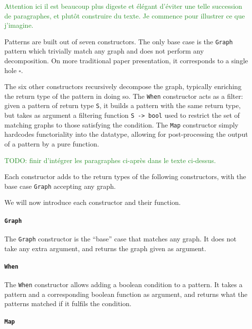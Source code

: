 \documentclass[11pt]{article}
\newcommand{\inlinecoq}[1]{\mbox{\lstinline[style=customcoq,columns=fixed,basewidth=.48em]{#1}}}
\newcommand{\ilc}[1]{\inlinecoq{#1}}
\newcommand{\yz}[1]{\textcolor{ForestGreen}{#1}}
\newcommand{\yzt}[1]{\textcolor{ForestGreen!50}{#1}}
\begin{document}
\yz{Attention ici il est beaucoup plus digeste et élégant d'éviter une telle succession de paragraphes, et plutôt construire du texte. Je commence pour illustrer ce que j'imagine.}

\yzt{Patterns are built out of seven constructors. The only base case is the \ilc{Graph} pattern which trivially match any graph and does not perform any decomposition. On more traditional paper presentation, it corresponds to a single hole $\square$.}

\yzt{The six other constructors recursively decompose the graph, typically enriching the return type of the pattern in doing so. 
The \ilc{When} constructor acts as a filter:
given a pattern of return type \ilc{S}, it builds a pattern with the same return type, but takes as argument a filtering function \ilc{S -> bool} used to restrict the set of matching graphs to those satisfying the condition.
The \ilc{Map} constructor simply hardcodes functoriality into the datatype, allowing for post-processing the output of a pattern by a pure function.
}

\yz{TODO: finir d'intégrer les paragraphes ci-après dans le texte ci-dessus.}


Each constructor adds to the return types of the following constructors, with the base case \ilc{Graph} accepting any graph.

We will now introduce each constructor and their function.

\paragraph{\ilc{Graph}}

The \ilc{Graph} constructor is the ``base'' case that matches any graph. It does not take any extra argument, and returns the graph given as argument.

\paragraph{\ilc{When}}

The \ilc{When} constructor allows adding a boolean condition to a pattern.
It takes a pattern and a corresponding boolean function as argument, and returns what the patterns matched if it fulfils the condition.

\paragraph{\ilc{Map}}
\end{document}
